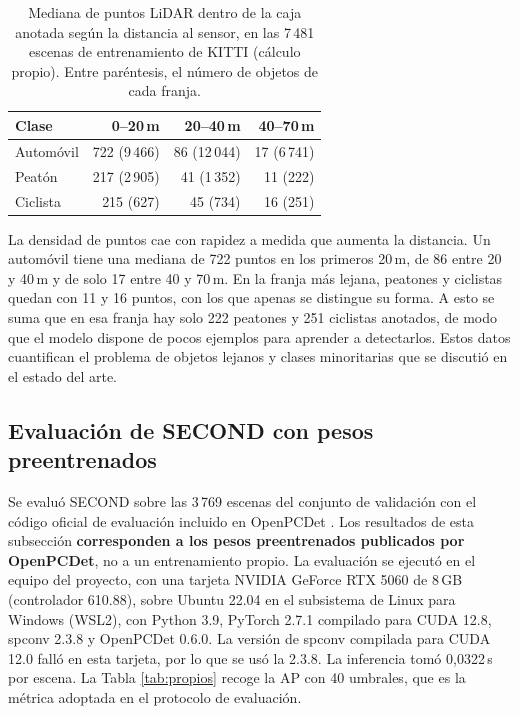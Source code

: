 \documentclass[11pt,letterpaper]{article}
\begin{document}
\begin{table}[htbp]
\caption{Mediana de puntos LiDAR dentro de la caja anotada según la distancia al sensor, en las 7\,481 escenas de entrenamiento de KITTI (cálculo propio). Entre paréntesis, el número de objetos de cada franja.}
\label{tab:puntos}
\centering
\small
\begin{tabular}{@{}lrrr@{}}
\toprule
\textbf{Clase} & \textbf{0--20\,m} & \textbf{20--40\,m} & \textbf{40--70\,m} \\
\midrule
Automóvil & 722 (9\,466) & 86 (12\,044) & 17 (6\,741) \\
Peatón    & 217 (2\,905) & 41 (1\,352)  & 11 (222) \\
Ciclista  & 215 (627)    & 45 (734)     & 16 (251) \\
\bottomrule
\end{tabular}
\end{table}

La densidad de puntos cae con rapidez a medida que aumenta la distancia. Un automóvil tiene una mediana de 722 puntos en los primeros 20\,m, de 86 entre 20 y 40\,m y de solo 17 entre 40 y 70\,m. En la franja más lejana, peatones y ciclistas quedan con 11 y 16 puntos, con los que apenas se distingue su forma. A esto se suma que en esa franja hay solo 222 peatones y 251 ciclistas anotados, de modo que el modelo dispone de pocos ejemplos para aprender a detectarlos. Estos datos cuantifican el problema de objetos lejanos y clases minoritarias que se discutió en el estado del arte.

\subsection{Evaluación de SECOND con pesos preentrenados}

Se evaluó SECOND sobre las 3\,769 escenas del conjunto de validación con el código oficial de evaluación incluido en OpenPCDet \cite{openpcdet}. Los resultados de esta subsección \textbf{corresponden a los pesos preentrenados publicados por OpenPCDet}, no a un entrenamiento propio. La evaluación se ejecutó en el equipo del proyecto, con una tarjeta NVIDIA GeForce RTX 5060 de 8\,GB (controlador 610.88), sobre Ubuntu 22.04 en el subsistema de Linux para Windows (WSL2), con Python 3.9, PyTorch 2.7.1 compilado para CUDA 12.8, spconv 2.3.8 y OpenPCDet 0.6.0. La versión de spconv compilada para CUDA 12.0 falló en esta tarjeta, por lo que se usó la 2.3.8. La inferencia tomó 0,0322\,s por escena. La Tabla \ref{tab:propios} recoge la AP con 40 umbrales, que es la métrica adoptada en el protocolo de evaluación.
\end{document}
